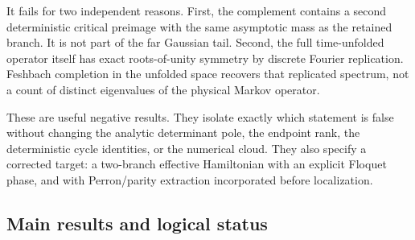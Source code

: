 \documentclass[11pt]{article}
\theoremstyle{definition}
\theoremstyle{remark}
\begin{document}
It fails for two independent reasons.  First, the complement contains a
second deterministic critical preimage with the same asymptotic mass as the
retained branch.  It is not part of the far Gaussian tail.  Second, the full
time-unfolded operator itself has exact roots-of-unity symmetry by discrete
Fourier replication.  Feshbach completion in the unfolded space recovers
that replicated spectrum, not a count of distinct eigenvalues of the
physical Markov operator.

These are useful negative results.  They isolate exactly which statement is
false without changing the analytic determinant pole, the endpoint rank,
the deterministic cycle identities, or the numerical cloud.  They also
specify a corrected target: a two-branch effective Hamiltonian with an
explicit Floquet phase, and with Perron/parity extraction incorporated before
localization.

\subsection*{Main results and logical status}
\end{document}
